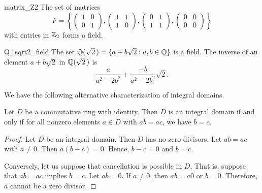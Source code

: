  
\begin{example}{matrix_Z2}
The set of matrices
\[
F
=
\left\{
\left(
\begin{array}{cc}
1 & 0 \\
0 & 1
\end{array}
\right),
\left(
\begin{array}{cc}
1 & 1 \\
1 & 0
\end{array}
\right),
\left(
\begin{array}{cc}
0 & 1 \\
1 & 1
\end{array}
\right),
\left(
\begin{array}{cc}
0 & 0 \\
0 & 0
\end{array}
\right)
\right\}
\]
with entries in ${\Bbb Z}_2$ forms a field.
\end{example}
 
 
\begin{example}{Q_sqrt2_field}
The set ${\Bbb Q}( \sqrt{2}\, ) = \{ a + b \sqrt{2} : a, b \in {\Bbb Q}
\}$ is a field. The inverse of an element $a + b \sqrt{2}$ in ${\Bbb
Q}( \sqrt{2}\, )$ is  
\[
\frac{a}{a^2 - 2 b^2} +\frac{- b}{ a^2 - 2 b^2} \sqrt{2}.
\]
\end{example}
 
 

 
 
We have the following alternative characterization of integral
domains. 
 
 

 
 
\begin{proposition}
Let $D$ be a commutative ring with identity. Then $D$ is an integral
domain if and only if for all nonzero elements $a \in D$ with $ab =
ac$, we have $b=c$. 
\end{proposition}
 
 
\begin{proof}
Let $D$ be an integral domain. Then $D$ has no zero divisors.  Let $ab
= ac$ with $a \neq 0$. Then $a(b - c) =0$.  Hence, $b - c = 0$ and $b
= c$. 
 
 
Conversely, let us suppose that cancellation is possible in $D$.
That is, suppose that $ab = ac$ implies $b=c$. Let $ab = 0$.  If $a
\neq 0$, then $ab = a 0$ or $b=0$.  Therefore, $a$ cannot be a zero
divisor. 
\end{proof}
 
 
\medskip
 

